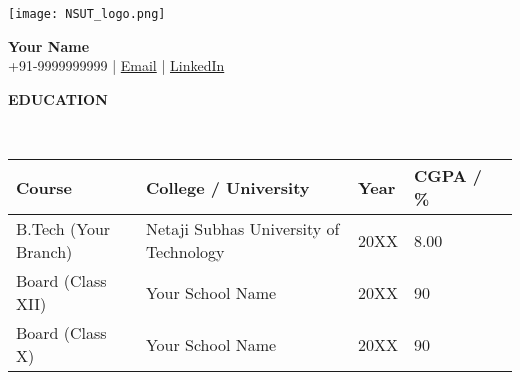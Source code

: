 \documentclass[11pt,article]{article}
\newcommand{\resheading}[1]{{\small \colorbox{mygrey} { \begin{minipage}{0.99\textwidth}{\textbf{#1 \vphantom{p\^{E}}}}\end{minipage}}}}
\begin{document}
\begin{table}
    \begin{minipage}{0\linewidth}
        \centering
        \texttt{[image: NSUT\_logo.png]}
    \end{minipage}
    \begin{minipage}{1\linewidth}
        \centering
        \def\arraystretch{1}
        \textbf{\Large{Your Name}}\\ \vspace{0.4em}
        +91-9999999999 |
        \href{mailto:your.email@example.com}{Email} |
        \href{https://www.linkedin.com/in/}{LinkedIn}
    \end{minipage}\hfill
\end{table}
\setlength{\tabcolsep}{18pt}

\begin{table}
\centering
\resheading{\textbf{EDUCATION} }\\
\vspace{0.4em}
\begin{tabular}{lllll}
\textbf{Course}    & \textbf{College / University}     & \textbf{Year}     & \textbf{CGPA / \%} \\ 
\toprule
B.Tech (Your Branch)   & Netaji Subhas University of Technology  & 20XX   & 8.00 \\  
Board (Class XII)      & Your School Name & 20XX & 90  \\ 
Board (Class X)        & Your School Name & 20XX & 90
\vspace{-0.8em}
\end{tabular}
\end{table}
\end{document}
